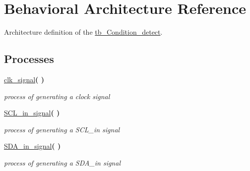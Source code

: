 \hypertarget{classtb___condition__detect_1_1_behavioral}{}\section{Behavioral Architecture Reference}
\label{classtb___condition__detect_1_1_behavioral}


Architecture definition of the \hyperlink{classtb___condition__detect}{tb\+\_\+\+Condition\+\_\+detect}.  


\subsection*{Processes}
 \begin{DoxyCompactItemize}
\item 
\hyperlink{classtb___condition__detect_1_1_behavioral_a99f3164d142507cc4972fec85ccfe73a}{clk\+\_\+signal}{\bfseries  (  )}\hypertarget{classtb___condition__detect_1_1_behavioral_a99f3164d142507cc4972fec85ccfe73a}{}\label{classtb___condition__detect_1_1_behavioral_a99f3164d142507cc4972fec85ccfe73a}

\begin{DoxyCompactList}\small\item\em process of generating a clock signal \end{DoxyCompactList}\item 
\hyperlink{classtb___condition__detect_1_1_behavioral_a548c1354bb219eae313a2ef537ad8357}{S\+C\+L\+\_\+in\+\_\+signal}{\bfseries  (  )}\hypertarget{classtb___condition__detect_1_1_behavioral_a548c1354bb219eae313a2ef537ad8357}{}\label{classtb___condition__detect_1_1_behavioral_a548c1354bb219eae313a2ef537ad8357}

\begin{DoxyCompactList}\small\item\em process of generating a S\+C\+L\+\_\+in signal \end{DoxyCompactList}\item 
\hyperlink{classtb___condition__detect_1_1_behavioral_a159481b3a7ca193d0d426da7cbafe221}{S\+D\+A\+\_\+in\+\_\+signal}{\bfseries  (  )}\hypertarget{classtb___condition__detect_1_1_behavioral_a159481b3a7ca193d0d426da7cbafe221}{}\label{classtb___condition__detect_1_1_behavioral_a159481b3a7ca193d0d426da7cbafe221}

\begin{DoxyCompactList}\small\item\em process of generating a S\+D\+A\+\_\+in signal \end{DoxyCompactList}\end{DoxyCompactItemize}
